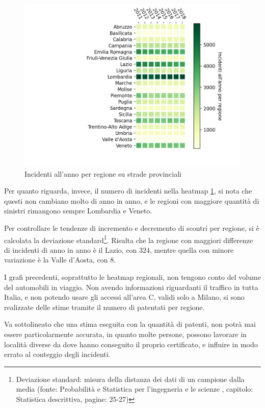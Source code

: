 \documentclass[a4paper,12pt]{report}
\begin{document}
\begin{figure}
    \includegraphics[width=\linewidth]{../src/incidenti/incidenti_aci/mappe_regioni/regioni_heatmap.png}
    \caption{Incidenti all'anno per regione su strade provinciali}
    \label{fig:regione-heatmap}
\end{figure}

Per quanto riguarda, invece, il numero di incidenti 
nella heatmap \ref{fig:regione-heatmap}, 
si nota che questi non cambiano molto di anno in anno, e le regioni con maggiore quantità 
di sinistri rimangono sempre Lombardia e Veneto. 

Per controllare le tendenze di incremento e decremento di scontri per regione, 
si è calcolata la deviazione standard\footnote{Deviazione standard: 
misura della distanza dei dati di un campione dalla media 
(fonte: Probabilità e Statistica per l'ingegneria e le scienze \cite{PROB_E_STATISTICA:1}, 
capitolo: Statistica descrittiva, pagine: 25-27)}. 
Risulta che la regione con maggiori differenze di incidenti di anno in anno 
è il Lazio, con $324$, mentre quella con minore 
variazione è la Valle d'Aosta, con $8$. 

I grafi precedenti, soprattutto le heatmap regionali, non tengono conto del 
volume del automobili in viaggio. 
Non avendo informazioni riguardanti il traffico in tutta Italia, 
e non potendo usare gli accessi all'area C, validi solo a Milano, si sono realizzate 
delle stime tramite il numero di patentati per regione. 

Va sottolineato che una stima eseguita con la quantità di patenti, 
non potrà mai essere particolarmente accurata, in quanto molte persone, possono 
lavorare in località diverse da dove hanno conseguito il proprio certificato, 
e influire in modo errato al conteggio degli incidenti. 
\end{document}
